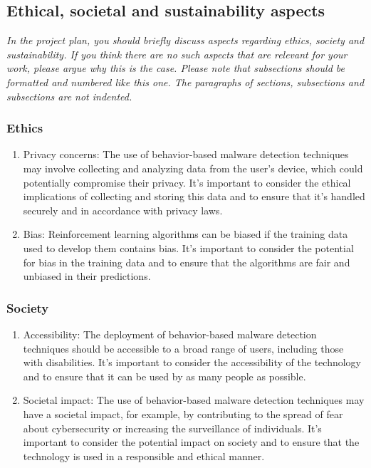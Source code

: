 \documentclass[12pt,a4paper,twoside]{article}
\begin{document}
\subsection{Ethical, societal and sustainability aspects}
\label{sec:ethics}

\textit{In the project plan, you should briefly discuss aspects regarding ethics, society and sustainability. If you think there are no such aspects that are relevant for your work, please argue why this is the case. Please note that subsections should be formatted and numbered like this one. The paragraphs of sections, subsections and subsections are not indented.}

\subsubsection{Ethics}\label{sec:Ethics}
    \begin{enumerate}

        \item Privacy concerns: The use of behavior-based malware detection techniques may involve collecting and analyzing data from the user's device, which could potentially compromise their privacy. It's important to consider the ethical implications of collecting and storing this data and to ensure that it's handled securely and in accordance with privacy laws.

        \item  Bias: Reinforcement learning algorithms can be biased if the training data used to develop them contains bias. It's important to consider the potential for bias in the training data and to ensure that the algorithms are fair and unbiased in their predictions.

    \end{enumerate}

\subsubsection{Society}\label{sec:Society}
    \begin{enumerate}

        \item Accessibility: The deployment of behavior-based malware detection techniques should be accessible to a broad range of users, including those with disabilities. It's important to consider the accessibility of the technology and to ensure that it can be used by as many people as possible.

        \item  Societal impact: The use of behavior-based malware detection techniques may have a societal impact, for example, by contributing to the spread of fear about cybersecurity or increasing the surveillance of individuals. It's important to consider the potential impact on society and to ensure that the technology is used in a responsible and ethical manner.

    \end{enumerate}
\end{document}
